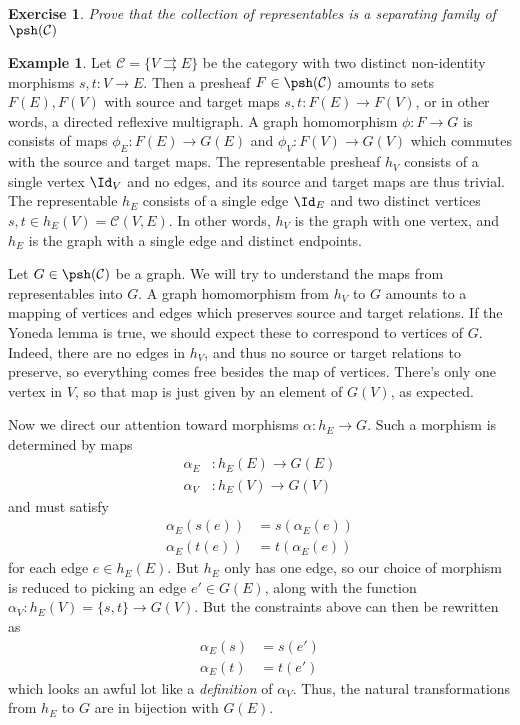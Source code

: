 \documentclass[11pt]{article}
\theoremstyle{plain}
\newtheorem{exrc}[thm]{Exercise}
\theoremstyle{definition}
\newtheorem{exmp}[thm]{Example}
\newcommand{\s}[1]{\mathcal{#1}}
\begin{document}
\begin{exrc}
    Prove that the collection of representables is a separating family of $\psh(\s C)$
\end{exrc}

\begin{exmp}
    Let $\s C = \{V \rightrightarrows E\}$ be the category with two distinct non-identity morphisms $s,t : V \to E$. Then a presheaf $F \in \psh(\s C)$ amounts to sets $F(E), F(V)$ with source and target maps $s, t : F(E) \to F(V)$, or in other words, a directed reflexive multigraph.
    A graph homomorphism $\phi : F \to G$ is consists of maps $\phi_E : F(E) \to G(E)$ and $\phi_V : F(V) \to G(V)$ which commutes with the source and target maps.
    The representable presheaf $h_V$ consists of a single vertex $\Id_V$ and no edges, and its source and target maps are thus trivial.
    The representable $h_E$ consists of a single edge $\Id_E$ and two distinct vertices $s, t \in h_E(V) = \s C(V,E)$. In other words, $h_V$ is the graph with one vertex, and $h_E$ is the graph with a single edge and distinct endpoints.
    
    Let $G \in \psh(\s C)$ be a graph. We will try to understand the maps from representables into $G$.
    A graph homomorphism from $h_V$ to $G$ amounts to a mapping of vertices and edges which preserves source and target relations. If the Yoneda lemma is true, we should expect these to correspond to vertices of $G$.
    Indeed, there are no edges in $h_V$, and thus no source or target relations to preserve, so everything comes free besides the map of vertices.
    There's only one vertex in $V$, so that map is just given by an element of $G(V)$, as expected.
    
    Now we direct our attention toward morphisms $\alpha : h_E \to G$. Such a morphism is determined by maps
    \begin{align*}
        \alpha_E &: h_E(E) \to G(E) \\
        \alpha_V &: h_E(V) \to G(V)
    \end{align*}
    and must satisfy
    \begin{align*}
        \alpha_E(s(e)) &= s(\alpha_E(e)) \\
        \alpha_E(t(e)) &= t(\alpha_E(e))
    \end{align*}
    for each edge $e \in h_E(E)$. But $h_E$ only has one edge, so our choice of morphism is reduced to picking an edge $e' \in G(E)$, along with the function $\alpha_V : h_E(V) = \{s,t\} \to G(V)$. But the constraints above can then be rewritten as
    \begin{align*}
        \alpha_E(s) &= s(e') \\
        \alpha_E(t) &= t(e')
    \end{align*}
    which looks an awful lot like a \textit{definition} of $\alpha_V$. Thus, the natural transformations from $h_E$ to $G$ are in bijection with $G(E)$.
\end{exmp}
\end{document}
